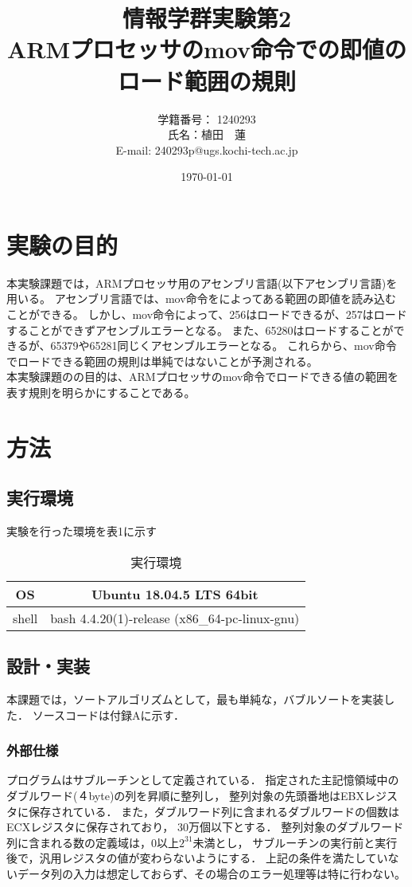 \documentclass[a4j]{jarticle}
\title{情報学群実験第2 \\ ARMプロセッサのmov命令での即値のロード範囲の規則}
\author{学籍番号： 1240293 \\ 氏名：植田　蓮\\E-mail: 240293p@ugs.kochi-tech.ac.jp}
\date{\today}
\begin{document}
\maketitle
\section{実験の目的}
本実験課題では，ARMプロセッサ用のアセンブリ言語(以下アセンブリ言語)を用いる。
アセンブリ言語では、mov命令をによってある範囲の即値を読み込むことができる。
しかし、mov命令によって、256はロードできるが、257はロードすることができずアセンブルエラーとなる。
また、65280はロードすることができるが、65379や65281同じくアセンブルエラーとなる。
これらから、mov命令でロードできる範囲の規則は単純ではないことが予測される。\\
\indent 本実験課題のの目的は、ARMプロセッサのmov命令でロードできる値の範囲を表す規則を明らかにすることである。



\section{方法}

\subsection{実行環境}
実験を行った環境を表1に示す
  \begin{table}[h]
    \centering
    \caption{実行環境}
    \begin{tabular}{|c|c|}
      \hline
      OS & Ubuntu 18.04.5 LTS 64bit \\ \hline
      shell & bash 4.4.20(1)-release (x86\_64-pc-linux-gnu) \\ \hline
    \end{tabular}
  \end{table}
  
  \subsection{設計・実装}
本課題では，ソートアルゴリズムとして，最も単純な，バブルソートを実装した．
ソースコードは付録Aに示す．

\subsubsection{外部仕様}
プログラムはサブルーチンとして定義されている．
指定された主記憶領域中のダブルワード(４byte)の列を昇順に整列し，
整列対象の先頭番地はEBXレジスタに保存されている．
また，ダブルワード列に含まれるダブルワードの個数はECXレジスタに保存されており，
30万個以下とする．
整列対象のダブルワード列に含まれる数の定義域は，0以上$2^{31}$未満とし，
サブルーチンの実行前と実行後で，汎用レジスタの値が変わらないようにする．
上記の条件を満たしていないデータ列の入力は想定しておらず、その場合のエラー処理等は特に行わない。
\end{document}
